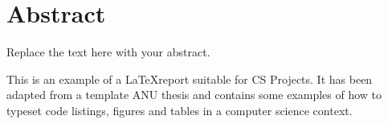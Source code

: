 \chapter*{Abstract}
\vspace{-1em}
Replace the text here with your abstract.

This is an example of a \LaTeX report suitable for CS Projects. It has
been adapted from a template ANU thesis and contains some examples of
how to typeset code listings, figures and tables in a computer science
context.

